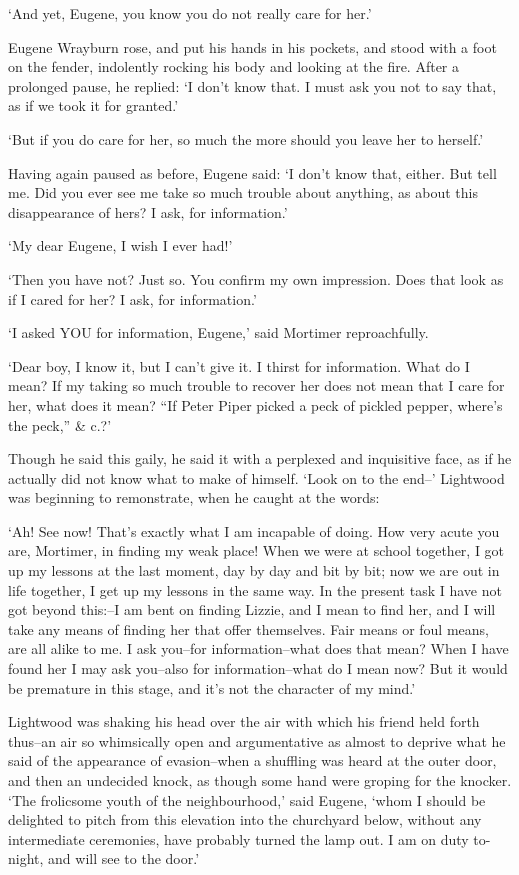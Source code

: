 ‘And yet, Eugene, you know you do not really care for her.’

Eugene Wrayburn rose, and put his hands in his pockets, and stood with a
foot on the fender, indolently rocking his body and looking at the fire.
After a prolonged pause, he replied: ‘I don’t know that. I must ask you
not to say that, as if we took it for granted.’

‘But if you do care for her, so much the more should you leave her to
herself.’

Having again paused as before, Eugene said: ‘I don’t know that, either.
But tell me. Did you ever see me take so much trouble about anything, as
about this disappearance of hers? I ask, for information.’

‘My dear Eugene, I wish I ever had!’

‘Then you have not? Just so. You confirm my own impression. Does that
look as if I cared for her? I ask, for information.’

‘I asked YOU for information, Eugene,’ said Mortimer reproachfully.

‘Dear boy, I know it, but I can’t give it. I thirst for information.
What do I mean? If my taking so much trouble to recover her does not
mean that I care for her, what does it mean? “If Peter Piper picked a
peck of pickled pepper, where’s the peck,” \& c.?’

Though he said this gaily, he said it with a perplexed and inquisitive
face, as if he actually did not know what to make of himself. ‘Look on
to the end--’ Lightwood was beginning to remonstrate, when he caught at
the words:

‘Ah! See now! That’s exactly what I am incapable of doing. How very
acute you are, Mortimer, in finding my weak place! When we were at
school together, I got up my lessons at the last moment, day by day and
bit by bit; now we are out in life together, I get up my lessons in the
same way. In the present task I have not got beyond this:--I am bent
on finding Lizzie, and I mean to find her, and I will take any means
of finding her that offer themselves. Fair means or foul means, are all
alike to me. I ask you--for information--what does that mean? When I
have found her I may ask you--also for information--what do I mean now?
But it would be premature in this stage, and it’s not the character of
my mind.’

Lightwood was shaking his head over the air with which his friend held
forth thus--an air so whimsically open and argumentative as almost to
deprive what he said of the appearance of evasion--when a shuffling was
heard at the outer door, and then an undecided knock, as though
some hand were groping for the knocker. ‘The frolicsome youth of the
neighbourhood,’ said Eugene, ‘whom I should be delighted to pitch from
this elevation into the churchyard below, without any intermediate
ceremonies, have probably turned the lamp out. I am on duty to-night,
and will see to the door.’


